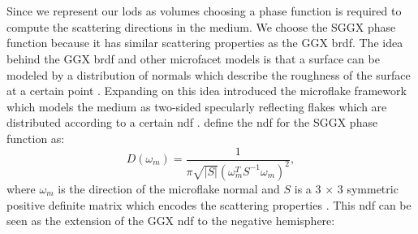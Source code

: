 \section{}
Since we represent our \acp{lod} as volumes choosing a phase function is required to compute the scattering directions in the medium.
We choose the SGGX phase function because it has similar scattering properties as the GGX \ac{brdf}\cite[p. 2]{sggx}.
The idea behind the GGX \ac{brdf} and other microfacet models is that a surface can be modeled by a distribution of normals which describe the roughness of the surface at a certain point \cite[p. 3]{ggx}.
Expanding on this idea \citeauthor{microflake} introduced the microflake framework which models the medium as two-sided specularly reflecting flakes which are distributed according to a certain \ac{ndf} \cite[pp. 4-5]{microflake}.
\citeauthor{sggx} define the \ac{ndf} for the SGGX phase function as:
\begin{equation}
    D(\omega_m)=\frac{1}{\pi \sqrt{|S|}(\omega_m^T S^{-1} \omega_m)^2},
\end{equation}
where $\omega_m$ is the direction of the microflake normal and $S$ is a 3 $\times$ 3 symmetric positive definite matrix which encodes the scattering properties \cite[p. 4]{sggx}.
This \ac{ndf} can be seen as the extension of the GGX \acs{ndf} to the negative hemisphere:
